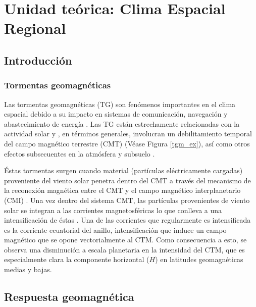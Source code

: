 \chapter{Unidad teórica: Clima Espacial Regional}

\section{Introducción}

\subsection{Tormentas geomagnéticas}

Las tormentas geomagnéticas (TG) son fenómenos importantes en el clima espacial debido a su impacto en sistemas de comunicación, navegación y abastecimiento de energía \cite{schrijver2015}. Las TG están estrechamente relacionadas con la actividad solar y , en términos generales, involucran un debilitamiento temporal del campo magnético terrestre (CMT) (Véase Figura \ref{tgm_ex}), así como otros efectos subsecuentes en la atmósfera y subsuelo \cite{gonzalestgm}. 
\vspace{1 em}

Éstas tormentas surgen cuando material (partículas eléctricamente cargadas) proveniente del viento solar penetra dentro del CMT a través del mecanismo de la reconexión magnética entre el CMT y el campo magnético interplanetario (CMI) \cite{l_basic_spaceplasmaphysic, l_russell}. Una vez dentro del sistema CMT, las partículas provenientes de viento solar se integran a las corrientes magnetosféricas lo que conlleva a una intensificación de éstas \cite{l_basic_spaceplasmaphysic}. Una de las corrientes que regularmente es intensificada es la corriente ecuatorial del anillo, intensificación que induce un campo magnético que se opone vectorialmente al CTM. Como consecuencia a esto, se observa una disminución a escala planetaria en la intensidad del CTM, que es especialmente clara la componente horizontal ($H$) en latitudes geomagnéticas medias y bajas.
\vspace{ 1 em}

\section{Respuesta geomagnética}

